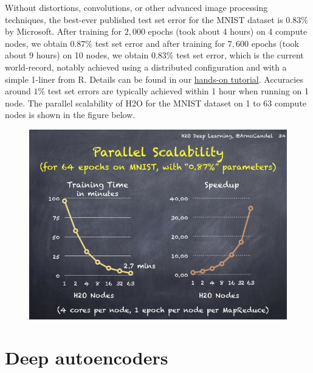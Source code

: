\documentclass[11pt]{article}
\begin{document}
Without distortions, convolutions, or other advanced image processing techniques, the best-ever published test set error for the MNIST dataset is $0.83$\% by Microsoft. After training for $2,000$ epochs (took about 4 hours) on 4 compute nodes, we obtain $0.87\%$ test set error and after training for $7,600$ epochs (took about 9 hours) on 10 nodes, we obtain $0.83\%$ test set error, which is the current world-record, notably achieved using a distributed configuration and with a simple 1-liner from R. Details can be found in our \href{http://learn.h2o.ai/content/hands-on_training/deep_learning.html}{hands-on tutorial}. Accuracies around $1\%$ test set errors are typically achieved within 1 hour when running on 1 node.
The parallel scalability of H2O for the MNIST dataset on 1 to 63 compute nodes is shown in the figure below.
\begin{figure}[h!]
\centering
\includegraphics[scale=0.5]{scalability.png}
\end{figure}
\bigskip
\bigskip
\bigskip
\section{Deep autoencoders} \label{4}
\end{document}
